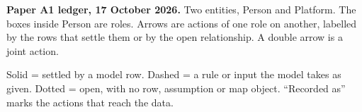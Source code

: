 \documentclass[border=8pt]{standalone}
\begin{document}
\begin{minipage}{27cm}
\par\bigskip
{\small\textbf{Paper A1 ledger, 17 October 2026.} Two entities, Person and Platform. The boxes inside Person are roles. Arrows are actions of one role on another, labelled by the rows that settle them or by the open relationship. A double arrow is a joint action.\par
Solid = settled by a model row. \quad Dashed = a rule or input the model takes as given. \quad Dotted = open, with no row, assumption or map object. \quad ``Recorded as'' marks the actions that reach the data.\par}
\end{minipage}
\end{document}
